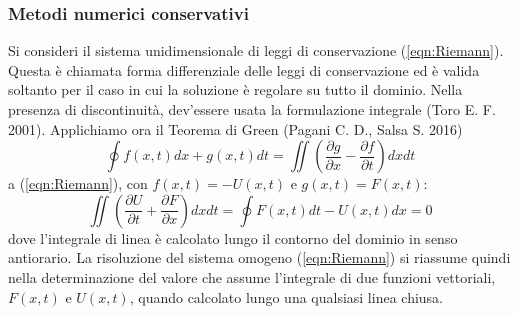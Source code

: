 \documentclass[12pt]{article} %
\begin{document}
\subsubsection{Metodi numerici conservativi}
\noindent Si consideri il sistema unidimensionale di leggi di conservazione (\ref{eqn:Riemann}). Questa è chiamata forma differenziale delle leggi di conservazione ed è valida soltanto per il caso in cui la soluzione è regolare su tutto il dominio. Nella presenza di discontinuità, dev'essere usata la formulazione integrale (Toro E. F. 2001).
\noindent Applichiamo ora il Teorema di Green (Pagani C. D., Salsa S. 2016)
\begin{equation}
    \oint f(x,t)dx + g(x,t)dt = \iint \left(\frac{\partial g}{\partial x}-\frac{\partial f}{\partial t}\right)dxdt
    \label{eqn:teorema_Green}
\end{equation}
\noindent a (\ref{eqn:Riemann}), con $f(x,t) = -U(x,t)$ e $g(x,t) = F(x,t)$:
\begin{equation}
    \iint \left(\frac{\partial U}{\partial t}+\frac{\partial F}{\partial x}\right)dxdt = \oint F(x,t)dt - U(x,t)dx = 0
    \label{eqn:teorema_Green_app_Riemann}
\end{equation}
\noindent dove l'integrale di linea è calcolato lungo il contorno del dominio in senso antiorario. La risoluzione del sistema omogeno (\ref{eqn:Riemann}) si riassume quindi nella determinazione del valore che assume l'integrale di due funzioni vettoriali, $F(x,t)$ e $U(x,t)$, quando calcolato lungo una qualsiasi linea chiusa. 
\end{document}
